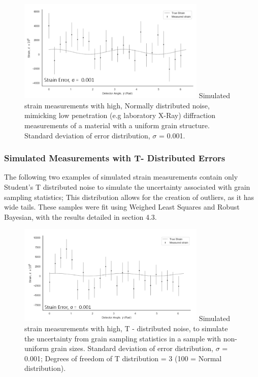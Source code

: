  
  \begin{figure}[H]
 	\centering
 	\includegraphics[width=0.8\textwidth]{chapters/chapter02/fig02/sample6.png}
 	\mycaption
 	{Simulated strain measurements with high, Normally distributed noise, mimicking low penetration (e.g laboratory X-Ray) diffraction measurements of a material with a uniform grain structure. Standard deviation of error distribution, $\sigma$ = 0.001.}
    \label{fig:RHP02}
 \end{figure}

\subsubsection{Simulated Measurements with T- Distributed Errors}

The following two examples of simulated strain measurements contain only Student's T distributed noise to simulate the uncertainty associated with grain sampling statistics; This distribution allows for the creation of outliers, as it has wide tails. These samples were fit using Weighed Least Squares and Robust Bayesian, with the results detailed in section 4.3.

  \begin{figure}[H]
 	\centering
 	\includegraphics[width=0.8\textwidth]{chapters/chapter02/fig02/sample3.png}
 	\mycaption
 	{Simulated strain measurements with high, T - distributed noise, to simulate the uncertainty from grain sampling statistics in a sample with non-uniform grain sizes. Standard deviation of error distribution, $\sigma$ = 0.001; Degrees of freedom of T distribution = 3 (100 = Normal distribution).}
    \label{fig:RHP02}
 \end{figure}

